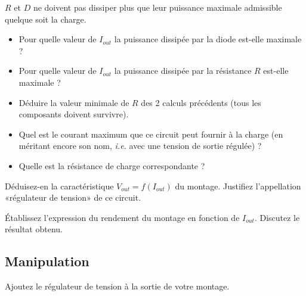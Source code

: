 \documentclass{../template/labo}
\begin{document}
\Question
{
	$R$ et $D$ ne doivent pas dissiper plus que leur puissance maximale admissible quelque soit la charge. %
	\begin{itemize}
	\item Pour quelle valeur de $I_{out}$ la puissance dissipée par la diode est-elle maximale ?
	\item Pour quelle valeur de $I_{out}$ la puissance dissipée par la résistance $R$ est-elle maximale ? 
	\item Déduire la valeur minimale de $R$ des 2 calculs précédents (tous les composants doivent survivre).
	\item Quel est le courant maximum que ce circuit peut fournir à la charge (en méritant encore son nom, \textit{i.e.} avec une tension de sortie régulée) ?
	\item Quelle est la résistance de charge correspondante ?
	\end{itemize}
}
{}%
	\label{Q:23}

\Question
{
	Déduisez-en la caractéristique $V_{out} = f(I_{out})$ du montage.
	Justifiez l'appellation «régulateur de tension» de ce circuit.
}
{}%
	\label{Q:24}

%
%	
%	
%	
%	
%	
%
\Question
{
	Établissez l'expression du rendement du montage en fonction de $I_{out}$.
	Discutez le résultat obtenu.
}
{}%
	\label{Q:25}

\vspace{-0.5cm}
%
%
%	
%	
\subsection{Manipulation}
\Question
{
	Ajoutez le régulateur de tension à la sortie de votre montage.
}
{}%
	\label{Q:26}
\end{document}
